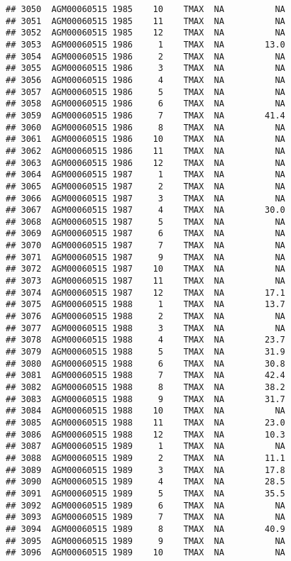 \documentclass{article}\usepackage[]{graphicx}\usepackage[]{color}
\makeatletter
\newenvironment{kframe}{%
 \def\at@end@of@kframe{}%
 \ifinner\ifhmode%
  \def\at@end@of@kframe{\end{minipage}}%
  \begin{minipage}{\columnwidth}%
 \fi\fi%
 \def\FrameCommand##1{\hskip\@totalleftmargin \hskip-\fboxsep
 \colorbox{shadecolor}{##1}\hskip-\fboxsep
     \hskip-\linewidth \hskip-\@totalleftmargin \hskip\columnwidth}%
 \MakeFramed {\advance\hsize-\width
   \@totalleftmargin\z@ \linewidth\hsize
   \@setminipage}}%
 {\par\unskip\endMakeFramed%
 \at@end@of@kframe}
\newenvironment{knitrout}{}{} %
\makeatother
\begin{document}
\begin{knitrout}
\begin{kframe}
\begin{verbatim}
## 3050  AGM00060515 1985    10    TMAX  NA          NA
## 3051  AGM00060515 1985    11    TMAX  NA          NA
## 3052  AGM00060515 1985    12    TMAX  NA          NA
## 3053  AGM00060515 1986     1    TMAX  NA        13.0
## 3054  AGM00060515 1986     2    TMAX  NA          NA
## 3055  AGM00060515 1986     3    TMAX  NA          NA
## 3056  AGM00060515 1986     4    TMAX  NA          NA
## 3057  AGM00060515 1986     5    TMAX  NA          NA
## 3058  AGM00060515 1986     6    TMAX  NA          NA
## 3059  AGM00060515 1986     7    TMAX  NA        41.4
## 3060  AGM00060515 1986     8    TMAX  NA          NA
## 3061  AGM00060515 1986    10    TMAX  NA          NA
## 3062  AGM00060515 1986    11    TMAX  NA          NA
## 3063  AGM00060515 1986    12    TMAX  NA          NA
## 3064  AGM00060515 1987     1    TMAX  NA          NA
## 3065  AGM00060515 1987     2    TMAX  NA          NA
## 3066  AGM00060515 1987     3    TMAX  NA          NA
## 3067  AGM00060515 1987     4    TMAX  NA        30.0
## 3068  AGM00060515 1987     5    TMAX  NA          NA
## 3069  AGM00060515 1987     6    TMAX  NA          NA
## 3070  AGM00060515 1987     7    TMAX  NA          NA
## 3071  AGM00060515 1987     9    TMAX  NA          NA
## 3072  AGM00060515 1987    10    TMAX  NA          NA
## 3073  AGM00060515 1987    11    TMAX  NA          NA
## 3074  AGM00060515 1987    12    TMAX  NA        17.1
## 3075  AGM00060515 1988     1    TMAX  NA        13.7
## 3076  AGM00060515 1988     2    TMAX  NA          NA
## 3077  AGM00060515 1988     3    TMAX  NA          NA
## 3078  AGM00060515 1988     4    TMAX  NA        23.7
## 3079  AGM00060515 1988     5    TMAX  NA        31.9
## 3080  AGM00060515 1988     6    TMAX  NA        30.8
## 3081  AGM00060515 1988     7    TMAX  NA        42.4
## 3082  AGM00060515 1988     8    TMAX  NA        38.2
## 3083  AGM00060515 1988     9    TMAX  NA        31.7
## 3084  AGM00060515 1988    10    TMAX  NA          NA
## 3085  AGM00060515 1988    11    TMAX  NA        23.0
## 3086  AGM00060515 1988    12    TMAX  NA        10.3
## 3087  AGM00060515 1989     1    TMAX  NA          NA
## 3088  AGM00060515 1989     2    TMAX  NA        11.1
## 3089  AGM00060515 1989     3    TMAX  NA        17.8
## 3090  AGM00060515 1989     4    TMAX  NA        28.5
## 3091  AGM00060515 1989     5    TMAX  NA        35.5
## 3092  AGM00060515 1989     6    TMAX  NA          NA
## 3093  AGM00060515 1989     7    TMAX  NA          NA
## 3094  AGM00060515 1989     8    TMAX  NA        40.9
## 3095  AGM00060515 1989     9    TMAX  NA          NA
## 3096  AGM00060515 1989    10    TMAX  NA          NA

\end{verbatim}
\end{kframe}
\end{knitrout}
\end{document}
